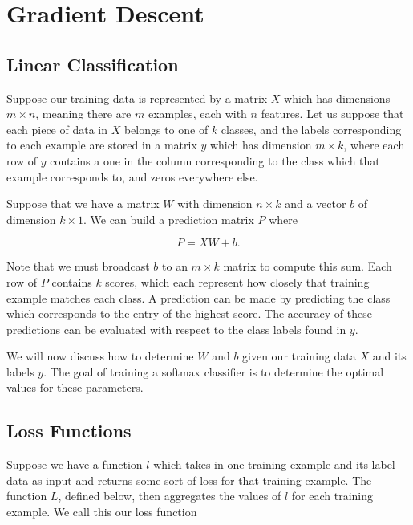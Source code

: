 \newpage
\section{Gradient Descent}\label{ch:gradient_descent}



\subsection{Linear Classification}

Suppose our training data is represented by a matrix $X$ which has dimensions
$m \times n$, meaning there are $m$ examples, each with $n$ features. Let us
suppose that each piece of data in $X$ belongs to one of $k$ classes, and the
labels corresponding to each example are stored in a matrix $y$ which has
dimension $m \times k$, where each row of $y$ contains a one in the column
corresponding to the class which that example corresponds to, and zeros
everywhere else.

Suppose that we have a matrix $W$ with dimension $n \times k$ and a vector $b$
of dimension $k \times 1$. We can build a prediction matrix $P$ where

\[
P = XW + b.
\]

Note that we must broadcast $b$ to an $m \times k$ matrix to compute this sum.
Each row of $P$ contains $k$ scores, which each represent how closely that
training example matches each class. A prediction can be made by predicting the
class which corresponds to the entry of the highest score. The accuracy of
these predictions can be evaluated with respect to the class labels found in
$y$.

We will now discuss how to determine $W$ and $b$ given our training data $X$
and its labels $y$. The goal of training a softmax classifier is to determine
the optimal values for these parameters.

\subsection{Loss Functions}

Suppose we have a function $l$ which takes in one training example and its
label data as input and returns some sort of loss for that training example.
The function $L$, defined below, then aggregates the values of $l$ for each
training example. We call this our loss function

